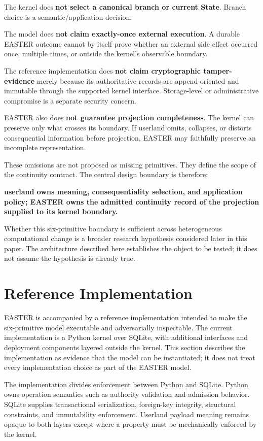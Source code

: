 \documentclass[11pt]{article}
\begin{document}
The kernel does \textbf{not select a canonical branch or current State}. Branch choice is a semantic/application decision.

The model does \textbf{not claim exactly-once external execution}. A durable EASTER outcome cannot by itself prove whether an external side effect occurred once, multiple times, or outside the kernel's observable boundary.

The reference implementation does \textbf{not claim cryptographic tamper-evidence} merely because its authoritative records are append-oriented and immutable through the supported kernel interface. Storage-level or administrative compromise is a separate security concern.

EASTER also does \textbf{not guarantee projection completeness}. The kernel can preserve only what crosses its boundary. If userland omits, collapses, or distorts consequential information before projection, EASTER may faithfully preserve an incomplete representation.

These omissions are not proposed as missing primitives. They define the scope of the continuity contract. The central design boundary is therefore:

\textbf{userland owns meaning, consequentiality selection, and application policy; EASTER owns the admitted continuity record of the projection supplied to its kernel boundary.}

Whether this six-primitive boundary is sufficient across heterogeneous computational change is a broader research hypothesis considered later in this paper. The architecture described here establishes the object to be tested; it does not assume the hypothesis is already true.
\section{Reference Implementation}

EASTER is accompanied by a reference implementation intended to make the six-primitive model executable and adversarially inspectable. The current implementation is a Python kernel over SQLite, with additional interfaces and deployment components layered outside the kernel. This section describes the implementation as evidence that the model can be instantiated; it does not treat every implementation choice as part of the EASTER model.

The implementation divides enforcement between Python and SQLite. Python owns operation semantics such as authority validation and admission behavior. SQLite supplies transactional serialization, foreign-key integrity, structural constraints, and immutability enforcement. Userland payload meaning remains opaque to both layers except where a property must be mechanically enforced by the kernel.
\end{document}
